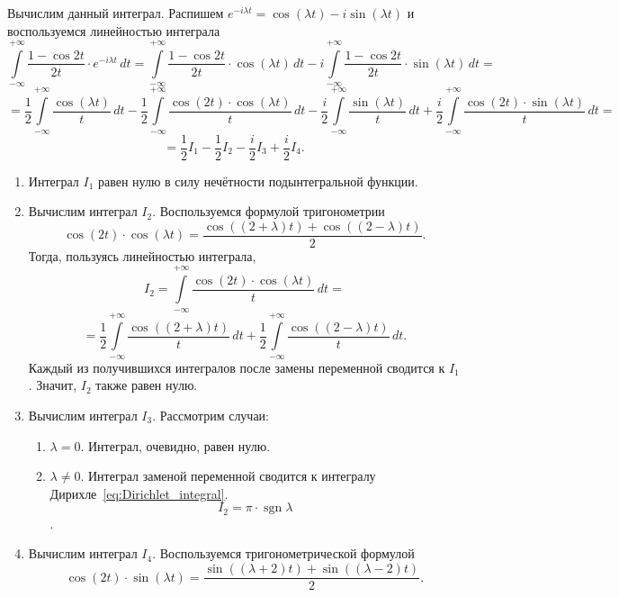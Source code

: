 \documentclass[a4paper, 11pt]{article}
\newcommand{\myint}[4]{\int\limits_{#1}^{#2}#3\,d#4}
\DeclareMathOperator{\sgn}{sgn}
\begin{document}
        Вычислим данный интеграл. Распишем $e^{-i\lambda t} = \cos(\lambda t) - i \sin(\lambda t)$ и воспользуемся линейностью интеграла
        $$    
        \myint{-\infty}{+\infty}{\frac{1 - \cos2t}{2t}\cdot e^{-i\lambda t}}{t} = \myint{-\infty}{+\infty}{\frac{1 - \cos2t}{2t}\cdot \cos(\lambda t)}{t} - i\myint{-\infty}{+\infty}{\frac{1 - \cos2t}{2t}\cdot \sin(\lambda t)}{t} =
        $$
        $$
            = \frac{1}{2}\myint{-\infty}{+\infty}{\frac{\cos(\lambda t)}{t}}{t}-\frac{1}{2}\myint{-\infty}{+\infty}{\frac{\cos(2t) \cdot \cos(\lambda t)}{t}}{t}- \frac{i}{2}\myint{-\infty}{+\infty}{\frac{\sin(\lambda t)}{t}} {t} +\frac{i}{2}\myint{-\infty}{+\infty}{\frac{\cos(2t)\cdot \sin(\lambda t)}{t}} {t} = 
        $$
        $$
            = \frac{1}{2}I_1 - \frac{1}{2}I_2 - \frac{i}{2}I_3 + \frac{i}{2}I_4.
        $$
        \begin{enumerate}
            \item Интеграл $I_1$ равен нулю в силу нечётности подынтегральной функции.
            \item Вычислим интеграл $I_2$.
                Воспользуемся формулой тригонометрии
                $$
                    \cos(2t) \cdot \cos(\lambda t) = \frac{\cos((2+\lambda)t) + \cos((2-\lambda)t)}{2}.
                $$
                Тогда, пользуясь линейностью интеграла,
                $$
                    I_2 = \myint{-\infty}{+\infty}{\frac{\cos(2t) \cdot \cos(\lambda t)}{t}}{t} =
                $$
                $$
                    = \frac{1}{2}\myint{-\infty}{+\infty}{\frac{\cos((2+\lambda)t)}{t}} {t}+\frac{1}{2}\myint{-\infty}{+\infty}{\frac{\cos((2-\lambda)t)}{t}} {t}.
                $$
                Каждый из получившихся интегралов после замены переменной сводится к $I_1$. Значит, $I_2$ также равен нулю.
            \item Вычислим интеграл $I_3$. Рассмотрим случаи:
                \begin{enumerate}
                    \item $\lambda = 0$. Интеграл, очевидно, равен нулю.
                    \item $\lambda \neq 0$. Интеграл заменой переменной сводится к интегралу Дирихле~\eqref{eq:Dirichlet_integral}. $$I_2 = \pi \cdot \sgn{\lambda}$$.
                \end{enumerate}
            \item Вычислим интеграл $I_4$. Воспользуемся тригонометрической формулой
                $$
                    \cos(2t)\cdot \sin(\lambda t) = \frac{\sin((\lambda+2)t) + \sin((\lambda-2)t)}{2}.
$$
\end{enumerate}
\end{document}
